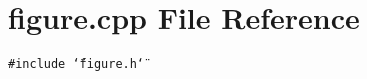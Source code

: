 \section{figure.cpp File Reference}
\label{figure_8cpp}
{\tt \#include \char`\"{}figure.h\char`\"{}}\par
